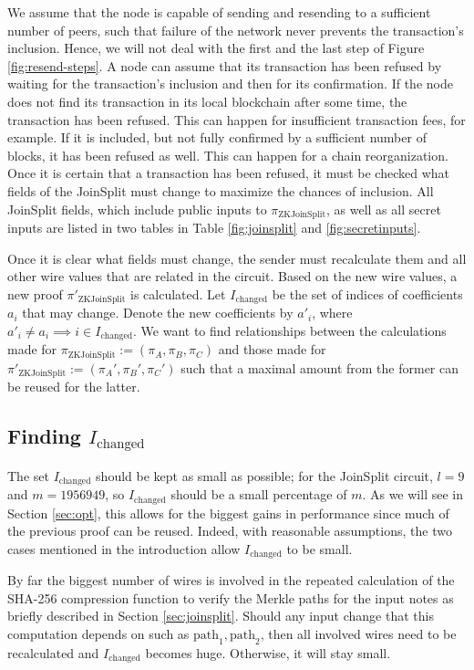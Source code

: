 \documentclass{article}
\begin{document}
We assume that the node is capable of sending and resending to a sufficient number of peers, such that failure of the network never prevents the transaction's inclusion.
Hence, we will not deal with the first and the last step of Figure \ref{fig:resend-steps}.
A node can assume that its transaction has been refused by waiting for the transaction's inclusion and then for its confirmation.
If the node does not find its transaction in its local blockchain after some time, the transaction has been refused.
This can happen for insufficient transaction fees, for example.
If it is included, but not fully confirmed by a sufficient number of blocks, it has been refused as well.
This can happen for a chain reorganization.
Once it is certain that a transaction has been refused, it must be checked what fields of the JoinSplit must change to maximize the chances of inclusion.
All JoinSplit fields, which include public inputs to $\pi_\text{ZKJoinSplit}$, as well as all secret inputs are listed in two tables in Table \ref{fig:joinsplit} and \ref{fig:secretinputs}.

Once it is clear what fields must change, the sender must recalculate them and all other wire values that are related in the circuit.
Based on the new wire values, a new proof $\pi'_\text{ZKJoinSplit}$ is calculated.
Let $I_\text{changed}$ be the set of indices of coefficients $a_i$ that may change.
Denote the new coefficients by $a'_i$, where $a'_i \neq a_i \implies i \in I_\text{changed}$.
We want to find relationships between the calculations made for $\pi_\text{ZKJoinSplit} := (\pi_A, \pi_B, \pi_C)$ and those made for $\pi'_\text{ZKJoinSplit} := (\pi_A', \pi_B', \pi_C')$ such that a maximal amount from the former can be reused for the latter.

\subsection{Finding $I_\text{changed}$}

The set $I_\text{changed}$ should be kept as small as possible; for the JoinSplit circuit, $l=9$ and $m=1956949$, so $I_\text{changed}$ should be a small percentage of $m$.
As we will see in Section \ref{sec:opt}, this allows for the biggest gains in performance since much of the previous proof can be reused.
Indeed, with reasonable assumptions, the two cases mentioned in the introduction allow $I_\text{changed}$ to be small.

By far the biggest number of wires is involved in the repeated calculation of the SHA-256 compression function to verify the Merkle paths for the input notes as briefly described in Section \ref{sec:joinsplit}.
Should any input change that this computation depends on such as $\text{path}_1,\text{path}_2$, then all involved wires need to be recalculated and $I_\text{changed}$ becomes huge.
Otherwise, it will stay small.
\end{document}
